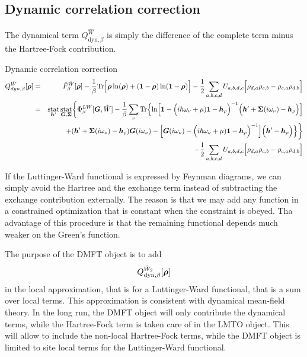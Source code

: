 \documentclass[11pt,a4paper]{report}
\begin{document}
\subsection{Dynamic correlation correction}
The dynamical term $Q_{\text{dyn},\beta}^{\hat{W}}$
is simply the difference of the complete term minus
the Hartree-Fock contribution.
\begin{myshadowminipage}{Dynamic correlation correction}
\begin{eqnarray}
Q^{\hat{W}}_{dyn,\beta}[\bm{\rho}]
&=&\tilde{F}^{\hat{W}}_\beta[\bm{\rho}]
-
\frac{1}{\beta}\mathrm{Tr}\Bigl[
\bm{\rho}\ln(\bm{\rho})+(\bm{1}-\bm{\rho})\ln(\bm{1}-\bm{\rho})\Bigr]
-
\frac{1}{2}\sum_{a,b,c,d}U_{a,b,d,c}
\Bigl[\rho_{d,a}\rho_{c,b}-\rho_{c,a}\rho_{d,b}\Bigr]
\nonumber\\
&=&
\operatorname*{stat}_{\bm{h}'}\operatorname*{stat}_{\bm{G},\bm{\Sigma}}
\biggl\lbrace
\Phi^{LW}_\beta[\bm{G},\hat{W}]
-\frac{1}{\beta}\sum_\nu\mathrm{Tr}\Bigl\lbrace
\ln\Bigl[
\bm{1}-
\Bigl(i\hbar\omega_\nu+\mu)\bm{1}-\bm{h}_{\rho}\Bigr)^{-1}
\Bigl(\bm{h}'+\bm{\Sigma}(i\omega_\nu)-\bm{h}_{\rho}\Bigr)
\Bigr]
\nonumber\\&&
+(\bm{h}'+\bm{\Sigma}(i\omega_\nu)-\bm{h}_\rho)\bm{G}(i\omega_\nu)
-
\Bigl[
\bm{G}(i\omega_\nu)
-\Bigl(i\hbar\omega_\nu+\mu)\bm{1}-\bm{h}_{\rho}\Bigr)^{-1}
\Bigr]
\Bigl(\bm{h}'-\bm{h}_\rho\Bigr)\Bigr\rbrace
\biggr\rbrace
\nonumber\\
&&-
\frac{1}{2}\sum_{a,b,c,d}U_{a,b,d,c}
\Bigl[\rho_{d,a}\rho_{c,b}-\rho_{c,a}\rho_{d,b}\Bigr]
\label{eq:dmf1green}
\end{eqnarray}
\end{myshadowminipage}

If the Luttinger-Ward functional is expressed by Feynman diagrams, we
can simply avoid the Hartree and the exchange term instead of
subtracting the exchange contribution externally. The reason is that
we may add any function in a constrained optimization that is constant
when the constraint is obeyed. Tha advantage of this procedure is that
the remaining functional depends much weaker on the Green's function.

The purpose of the DMFT object is to add
\begin{eqnarray}
Q_{\text{dyn},\beta}^{\hat{W}_2}[\bm{\rho}]
\end{eqnarray}
in the local approximation, that is for a Luttinger-Ward functional,
that is a sum over local terms. This approximation is consistent with
dynamical mean-field theory. In the long run, the DMFT object will
only contribute the dynamical terms, while the Hartree-Fock term is
taken care of in the LMTO object. This will allow to include the
non-local Hartree-Fock terms, while the DMFT object is limited to site
local terms for the Luttinger-Ward functional.
\end{document}
